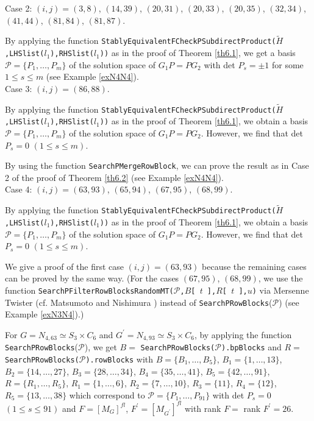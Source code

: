 \documentclass{amsart}
\theoremstyle{plain}
\theoremstyle{definition}
\theoremstyle{remark}
\begin{document}

Case 2: $(i,j)=(3,8)$, $(14,39)$, $(20,31)$, $(20,33)$, $(20,35)$, 
$(32,34)$, $(41,44)$, $(81,84)$, $(81,87)$. 

By applying the function 
{\tt StablyEquivalentFCheckPSubdirectProduct($\widetilde{H}$,LHSlist($l_1$),RHSlist($l_1$))} as in the proof of Theorem \ref{th6.1}, 
we get a basis $\mathcal{P}=\{P_1,\dots,P_m\}$ 
of the solution space of $G_1P=PG_2$ with det $P_s=\pm 1$ 
for some $1\leq s\leq m$ 
(see Example \ref{exN4N4}).\\

Case 3: $(i,j)=(86,88)$. 

By applying the function 
{\tt StablyEquivalentFCheckPSubdirectProduct($\widetilde{H}$,LHSlist($l_1$),RHSlist($l_1$))} as in the proof of Theorem \ref{th6.1}, 
we obtain a basis 
$\mathcal{P}=\{P_1,\dots,P_m\}$ of the solution space of $G_1P=PG_2$. 
However, we find that det $P_s=0$ $(1\leq s\leq m)$. 

By using the function {\tt SearchPMergeRowBlock}, 
we can prove the result as in Case 2 of the proof of Theorem \ref{th6.2} 
(see Example \ref{exN4N4}).\\

Case 4: $(i,j)=(63,93)$, $(65,94)$, $(67,95)$, $(68,99)$. 

By applying the function 
{\tt StablyEquivalentFCheckPSubdirectProduct($\widetilde{H}$,LHSlist($l_1$),RHSlist($l_1$))} as in the proof of Theorem \ref{th6.1}, 
we obtain a basis 
$\mathcal{P}=\{P_1,\dots,P_m\}$ of the solution space of $G_1P=PG_2$. 
However, we find that det $P_s=0$ $(1\leq s\leq m)$. 

We give a proof of the first case $(i,j)=(63,93)$ 
because the remaining cases can be proved by the same way. 
(For the cases $(67,95)$, $(68,99)$, we use the function 
{\tt SearchPFilterRowBlocksRandomMT($\mathcal{P}$,$B${\tt [}\,$t$\,{\tt ]},$R${\tt [}\,$t$\,{\tt ]},$u$)} via Mersenne Twister 
(cf. Matsumoto and Nishimura \cite{MN98})
instead of {\tt SearchPRowBlocks}($\mathcal{P}$) (see Example \ref{exN3N4}).)

For $G=N_{4,63}\simeq S_3\times C_6$ and 
$G^\prime=N_{4,93}\simeq S_3\times C_6$, 
by applying the function {\tt SearchPRowBlocks}($\mathcal{P}$), 
we get 
$B=$ {\tt SearchPRowBlocks($\mathcal{P}$).bpBlocks} 
and 
$R=$ {\tt SearchPRowBlocks($\mathcal{P}$).rowBlocks} 
with $B=\{B_1,\ldots,B_5\}$, 
$B_1=\{1,\ldots,13\}$, $B_2=\{14,\ldots,27\}$, 
$B_3=\{28,\ldots,34\}$, $B_4=\{35,\ldots,41\}$, 
$B_5=\{42,\ldots,91\}$, 
$R=\{R_1,\ldots,R_5\}$, 
$R_1=\{1,\ldots,6\}$, $R_2=\{7,\ldots,10\}$,
$R_3=\{11\}$, $R_4=\{12\}$, $R_5=\{13,\ldots,38\}$ 
which correspond to 
$\mathcal{P}=\{P_1,\ldots,P_{91}\}$ with 
det $P_s=0$ $(1\leq s\leq 91)$ and 
$F=[M_G]^{fl}$, $F^\prime=[M_{G^\prime}]^{fl}$ 
with rank $F=$ rank $F^\prime=26$. 
\end{document}
